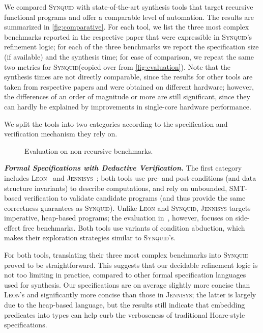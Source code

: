 \documentclass[10pt,preprint]{sigplanconf-pldi16}
\theoremstyle{definition}
\newcommand{\custompar}[1]{\parskip 0pt \textbf{\textit{#1}}}
\newcommand{\tool}{\textsc{Synquid}\xspace}
\begin{document}
We compared \tool with state-of-the-art synthesis tools that target recursive functional programs
and offer a comparable level of automation.
The results are summarized in \autoref{fig:comparative}.
For each tool, we list the three most complex benchmarks reported in the respective paper that were expressible in \tool's refinement logic;
for each of the three benchmarks we report the specification size (if available) and the synthesis time;
for ease of comparison, we repeat the same two metrics for \tool (copied over from \autoref{fig:evaluation}).
Note that the synthesis times are not directly comparable, 
since the results for other tools are taken from respective papers
and were obtained on different hardware;
however, the differences of an order of magnitude or more are still significant, 
since they can hardly be explained by improvements in single-core hardware performance.

We split the tools into two categories according to the specification and verification mechanism they rely on.

\begin{figure*}[!ht]
\centering
{}
\caption{Evaluation on non-recursive benchmarks.}
\label{fig:arithmetic_graphs}
\end{figure*}

\custompar{Formal Specifications with Deductive Verification.}
The first category includes \textsc{Leon}~\cite{KneussKuKuSu13} and \textsc{Jennisys}~\cite{LeinoMi12};
both tools use pre- and post-conditions (and data structure invariants) to describe computations,
and rely on unbounded, SMT-based verification to validate candidate programs
(and thus provide the same correctness guarantees as \tool).
Unlike \textsc{Leon} and \tool, \textsc{Jennisys} targets imperative, heap-based programs;
the evaluation in~\cite{LeinoMi12}, however, focuses on side-effect free benchmarks.
Both tools use variants of condition abduction, which makes their exploration strategies similar to \tool's.

For both tools, translating their three most complex benchmarks into \tool proved to be straightforward.
This suggests that our decidable refinement logic is not too limiting in practice,
compared to other formal specification languages used for synthesis.
Our specifications are on average slightly more concise than \textsc{Leon}'s and significantly more concise than those in \textsc{Jennisys};
the latter is largely due to the heap-based language,
but the results still indicate that embedding predicates into types can help curb the verboseness of traditional Hoare-style specifications. 
\end{document}
